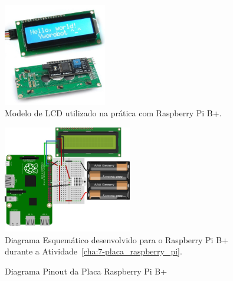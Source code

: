 \documentclass[
	12pt,				%
	openright,			%
  oneside,     %
	a4paper,			%
	english,			%
	french,				%
	spanish,			%
	brazil				%
	]{abntex2}
\begin{document}
\begin{figure}[!ht]
  \centering
  \caption{\label{fig:03e04DisplayLCD}Modelo de LCD utilizado na prática com Raspberry Pi B+.}
  \includegraphics[width=0.4\textwidth]{images/Atividade07/03e04DisplayLCD.jpg}
\end{figure}

\begin{figure}[!ht]
  \centering
  \caption{\label{fig:05Schematic}Diagrama Esquemático desenvolvido para o Raspberry Pi B+ durante a Atividade~\ref{cha:7-placa_raspberry_pi}.}
  \includegraphics[width=0.5\textwidth]{images/Atividade07/05Schematic.jpg}
\end{figure}

\newpage
\begin{figure}[H]
  \centering
  \caption{\label{fig:cha-7-diagrama-pinout}Diagrama Pinout da Placa Raspberry Pi B+}
  
\end{figure}

\newpage
\end{document}
